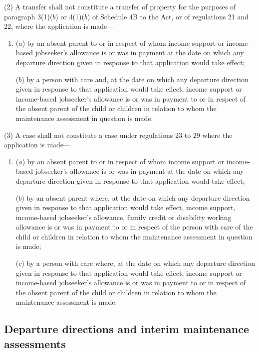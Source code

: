 \documentclass[12pt,a4paper]{article}
\begin{document}
(2) A transfer shall not constitute a transfer of property for the purposes of paragraph 3(1)($b$) or 4(1)($b$) of Schedule 4B to the Act, or of regulations 21 and 22, where the application is made—
\begin{enumerate}\item[]
($a$) by an absent parent to or in respect of whom income support or income-based jobseeker’s allowance is or was in payment at the date on which any departure direction given in response to that application would take effect;

($b$) by a person with care and, at the date on which any departure direction given in response to that application would take effect, income support or income-based jobseeker’s allowance is or was in payment to or in respect of the absent parent of the child or children in relation to whom the maintenance assessment in question is made.
\end{enumerate}

(3) A case shall not constitute a case under regulations 23 to 29 where the application is made—
\begin{enumerate}\item[]
($a$) by an absent parent to or in respect of whom income support or income-based jobseeker’s allowance is or was in payment at the date on which any departure direction given in response to that application would take effect;

($b$) by an absent parent where, at the date on which any departure direction given in response to that application would take effect, income support, income-based jobseeker’s allowance, family credit or disability working allowance is or was in payment to or in respect of the person with care of the child or children in relation to whom the maintenance assessment in question is made;

($c$) by a person with care where, at the date on which any departure direction given in response to that application would take effect, income support or income-based jobseeker’s allowance is or was in payment to or in respect of the absent parent of the child or children in relation to whom the maintenance assessment is made.
\end{enumerate}



\subsection[10. Departure directions and interim maintenance assessments]{Departure directions and interim maintenance assessments}
\end{document}
